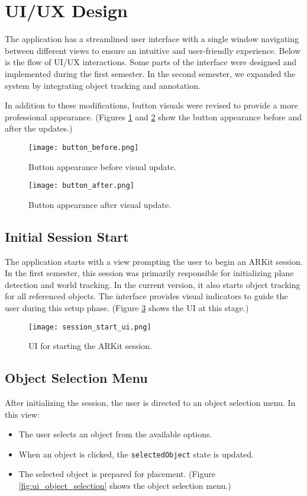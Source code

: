 \section{UI/UX Design}
The application has a streamlined user interface with a single window navigating between different views to ensure an intuitive and user-friendly experience. Below is the flow of UI/UX interactions. Some parts of the interface were designed and implemented during the first semester. In the second semester, we expanded the system by integrating object tracking and annotation.

In addition to these modifications, button visuals were revised to provide a more professional appearance. (Figures \ref{fig:button_before} and \ref{fig:button_after} show the button appearance before and after the updates.)

\begin{figure}[h!]
    \centering
    \texttt{[image: button\_before.png]}
    \caption{\centering Button appearance before visual update.}
    \label{fig:button_before}
\end{figure}

\begin{figure}[h!]
    \centering
    \texttt{[image: button\_after.png]}
    \caption{\centering Button appearance after visual update.}
    \label{fig:button_after}
\end{figure}

\subsection{Initial Session Start}
The application starts with a view prompting the user to begin an ARKit session. In the first semester, this session was primarily responsible for initializing plane detection and world tracking. In the current version, it also starts object tracking for all referenced objects. The interface provides visual indicators to guide the user during this setup phase. (Figure \ref{fig:ui_session_start} shows the UI at this stage.)
\begin{figure}[H]
    \centering
    \texttt{[image: session\_start\_ui.png]} %
    \caption{UI for starting the ARKit session.}
    \label{fig:ui_session_start}
\end{figure}

\subsection{Object Selection Menu}
After initializing the session, the user is directed to an object selection menu. In this view:
\begin{itemize}
    \item The user selects an object from the available options.
    \item When an object is clicked, the \texttt{selectedObject} state is updated.
    \item The selected object is prepared for placement. (Figure \ref{fig:ui_object_selection} shows the object selection menu.)
\end{itemize}

